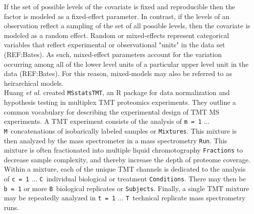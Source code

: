 \documentclass[11pt]{elife}\usepackage[]{graphicx}\usepackage[]{color}
\begin{document}
If the set of possible levels of the covariate is
fixed and reproducible then the factor is modeled as a fixed-effect parameter.
In contrast, if the levels of an observation reflect a sampling of the
set of all possible levels, then the covariate is modeled as a random effect.
Random or mixed-effects represent categorical variables
that reflect experimental or observational "units" in the data set (REF:Bates).
As such, mixed-effect parameters account for the variation occurring among all 
of the lower level units of a particular upper level unit in the data (REF:Bates).
For this reason, mixed-models may also be referred to as heirarchical models.\\


Huang \textit{et al.} created \texttt{MSstatsTMT}, an R package for data
normalization and hypothesis testing in multiplex TMT proteomics experiments. 
They outline a common vocabulary for describing the experimental design of 
TMT MS experiments. A TMT experiment consists
of the analysis of \texttt{m = 1} ... \texttt{M}\ concatenations of isobarically
labeled samples or \texttt{Mixtures}. This mixture is then analyzed by the mass
spectrometer in a mass spectrometry \texttt{Run}. This mixture is often
fractionated into multiple liquid chromotography \texttt{Fractions} to decrease
sample complexity, and thereby increase the depth of proteome coverage. 
Within a mixture, each of the unique TMT channels is dedicated to the 
analysis of \texttt{c = 1} ... \texttt{C}\ individual biological or treatment 
\texttt{Conditions}.  There may then be \texttt{b = 1} or more \texttt{B}\ 
biological replicates or \texttt{Subjects}. Finally, a single TMT mixture may be 
repeatedly analyzed in \texttt{t = 1} ... \texttt{T}\ technical replicate mass 
spectrometry runs.\\
\end{document}
